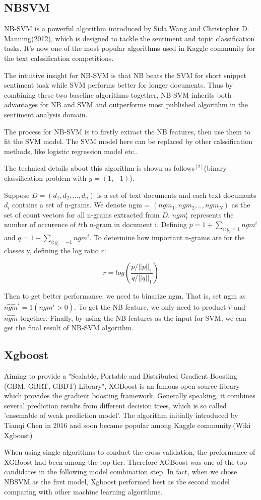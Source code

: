 \documentclass[letterpaper]{article} %
\begin{document}
\subsection{NBSVM}

NB-SVM is a powerful algorithm introduced by Sida Wang and Christopher D. Manning(2012), which is designed to tackle the sentiment and topic classification tasks. It's now one of the most popular algorithms used in Kaggle community for the text calssification competitions.

The intuitive insight for NB-SVM is that NB beats the SVM for short snippet sentiment task while SVM performs better for longer documents. Thus by combining these two baseline algorithms together, NB-SVM inherits both advantages for NB and SVM and outperforms most published algorithm in the sentiment analysis domain.

The process for NB-SVM is to firstly extract the NB features, then use them to fit the SVM model. The SVM model here can be replaced by other calssification methods, like logistic regression model etc..

The technical details about this algorithm is shown as follows$^{[2]}$(binary classification problem with $y=(1,-1)$).

Suppose $D = (d_1,d_2,...,d_n)$ is a set of text documents and each text documents $d_i$ contains a set of n-grams. We denote ngm = $(ngm_1,ngm_2,..,ngm_N)$ as the set of count vectors for all n-grams extracted from $D$. $ngm^i_t$ represents the number of occurence of $t$th n-gram in document i. Defining $p = 1+\sum_{i:y_i=1}ngm^i$ and $q=1+\sum_{i:y_i=-1}ngm^i$. To determine how important n-grams are for the classes y, defining the log ratio $r$:

$$r=log(\frac{p/||p||_1}{q/||q||_1})$$

Then to get better performance, we need to binarize ngm. That is, set ngm as $\hat{ngm}^{i}=1(ngm^i>0)$. To get the NB feature, we only need to product $\hat{r}$ and $\hat{ngm}$ together. Finally, by using the NB features as the input for SVM, we can get the final result of NB-SVM algorithm.

\subsection{Xgboost}

Aiming to provide a "Scalable, Portable and Distributed Gradient Boosting (GBM, GBRT, GBDT) Library", XGBoost is an famous open source library which provides the gradient boosting framework. Generally speaking, it combines several prediction results from different decision trees, which is so called 'ensemable of weak prediction model'. The algorithm initially introduced by Tianqi Chen in 2016 and soon became popular among Kaggle community.(Wiki Xgboost)\par
When using single algorithms to conduct the cross validation, the preformance of XGBoost had been among the top tier. Therefore XGBoost was one of the top candidates in the following model combination step. In fact, when we chose NBSVM as the first model, Xgboost performed best as the second model comparing with other machine learning algorithms.
\end{document}
